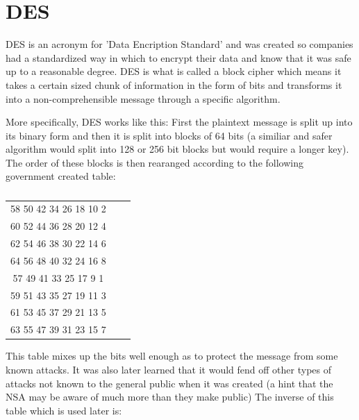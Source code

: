 \documentclass[12pt]{report}
\begin{document}
\section*{DES}

DES is an acronym for 'Data Encription Standard' and was created so companies had a standardized way in which to encrypt their data and know that it was safe up to a reasonable degree.  DES is what is called a block cipher which means it takes a certain sized chunk of information in the form of bits and transforms it into a non-comprehensible message through a specific algorithm.

More specifically, DES works like this:  First the plaintext message is split up into its binary form and then it is split into blocks of 64 bits (a similiar and safer algorithm would split into 128 or 256 bit blocks but would require a longer key).  The order of these blocks is then rearanged according to the following government created table:

\begin{table}[h]

\begin{center}

\begin{tabular}{ccl}
58  50  42  34  26  18  10  2 &  \\
60  52  44  36  28  20  12  4 &  \\
62  54  46  38  30  22  14  6 &  \\
64  56  48  40  32  24  16  8 &  \\
57  49  41  33  25  17  9   1 &  \\
59  51  43  35  27  19  11  3 &  \\
61  53  45  37  29  21  13  5 &  \\
63  55  47  39  31  23  15  7 &  \\
\end{tabular}

\caption{}\cite{DESalgorithm}

\end{center}

\end{table}

This table mixes up the bits well enough as to protect the message from some known attacks.  It was also later learned that it would fend off other types of attacks not known to the general public when it was created (a hint that the NSA may be aware of much more than they make public)
The inverse of this table which is used later is:
\end{document}
